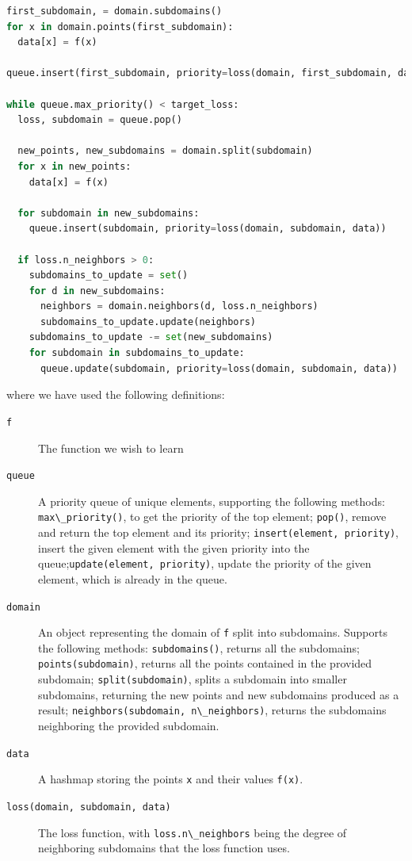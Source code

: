 \documentclass[english, twocolumn, 10pt, aps, superscriptaddress, floatfix, prb, citeautoscript]{revtex4-1}
\newcommand{\passthrough}[1]{\lstset{mathescape=false}#1\lstset{mathescape=true}}
\begin{document}
\begin{lstlisting}[language=Python]
first_subdomain, = domain.subdomains()
for x in domain.points(first_subdomain):
  data[x] = f(x)

queue.insert(first_subdomain, priority=loss(domain, first_subdomain, data))

while queue.max_priority() < target_loss:
  loss, subdomain = queue.pop()

  new_points, new_subdomains = domain.split(subdomain)
  for x in new_points:
    data[x] = f(x)

  for subdomain in new_subdomains:
    queue.insert(subdomain, priority=loss(domain, subdomain, data))

  if loss.n_neighbors > 0:
    subdomains_to_update = set()
    for d in new_subdomains:
      neighbors = domain.neighbors(d, loss.n_neighbors)
      subdomains_to_update.update(neighbors)
    subdomains_to_update -= set(new_subdomains)
    for subdomain in subdomains_to_update:
      queue.update(subdomain, priority=loss(domain, subdomain, data))
\end{lstlisting}

where we have used the following definitions:

\begin{description}
\item[\texttt{f}]
The function we wish to learn
\item[\texttt{queue}]
A priority queue of unique elements, supporting the following methods: \passthrough{\lstinline!max\_priority()!}, to get the priority of the top element; \passthrough{\lstinline!pop()!}, remove and return the top element and its priority; \passthrough{\lstinline!insert(element, priority)!}, insert the given element with the given priority into the queue;\passthrough{\lstinline!update(element, priority)!}, update the priority of the given element, which is already in the queue.
\item[\texttt{domain}]
An object representing the domain of \passthrough{\lstinline!f!} split into subdomains. Supports the following methods: \passthrough{\lstinline!subdomains()!}, returns all the subdomains; \passthrough{\lstinline!points(subdomain)!}, returns all the points contained in the provided subdomain; \passthrough{\lstinline!split(subdomain)!}, splits a subdomain into smaller subdomains, returning the new points and new subdomains produced as a result; \passthrough{\lstinline!neighbors(subdomain, n\_neighbors)!}, returns the subdomains neighboring the provided subdomain.
\item[\texttt{data}]
A hashmap storing the points \passthrough{\lstinline!x!} and their values \passthrough{\lstinline!f(x)!}.
\item[\texttt{loss(domain,\ subdomain,\ data)}]
The loss function, with \passthrough{\lstinline!loss.n\_neighbors!} being the degree of neighboring subdomains that the loss function uses.
\end{description}
\end{document}
